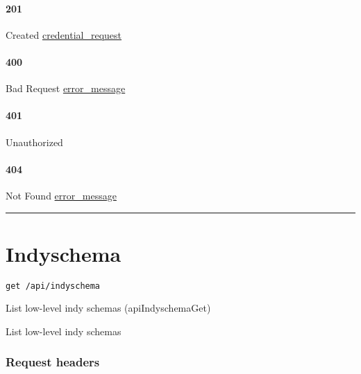 \hypertarget{section-140}{%
\paragraph{201}\label{section-140}}

Created \protect\hyperlink{credential_request}{credential\_request}

\hypertarget{section-141}{%
\paragraph{400}\label{section-141}}

Bad Request \protect\hyperlink{error_message}{error\_message}

\hypertarget{section-142}{%
\paragraph{401}\label{section-142}}

Unauthorized \protect\hyperlink{}{}

\hypertarget{section-143}{%
\paragraph{404}\label{section-143}}

Not Found \protect\hyperlink{error_message}{error\_message}

\begin{center}\rule{0.5\linewidth}{\linethickness}\end{center}

\hypertarget{indyschema-1}{%
\section{\texorpdfstring{\protect\hypertarget{Indyschema}{}{Indyschema}}{Indyschema}}\label{indyschema-1}}

\protect\hypertarget{apiIndyschemaGet}{}{}

\begin{verbatim}
get /api/indyschema
\end{verbatim}

List low-level indy schemas ({apiIndyschemaGet})

List low-level indy schemas

\hypertarget{request-headers-22}{%
\subsubsection{Request headers}\label{request-headers-22}}

